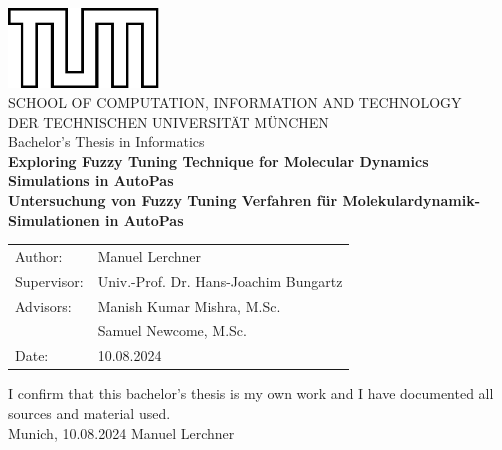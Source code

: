 \documentclass[11pt,
               a4paper,
               bibtotoc,
               idxtotoc,
               headsepline,
               footsepline,
               footexclude,
               BCOR12mm,
               DIV13,
               openany,   %
               ]
               {scrbook}
\def\doctype{Bachelor's Thesis\xspace}
\def\studyProgram{Informatics}
\def\title{Exploring Fuzzy Tuning Technique for Molecular Dynamics Simulations in AutoPas}
\def\titleGer{Untersuchung von Fuzzy Tuning Verfahren für Molekulardynamik-Simulationen in AutoPas}
\def\author{Manuel Lerchner}
\def\supervisor{Univ.-Prof. Dr. Hans-Joachim Bungartz}
\def\advisorFst{Manish Kumar Mishra, M.Sc.}
\def\advisorSnd{Samuel Newcome, M.Sc.}
\def\date{10.08.2024}
\begin{document}
\def\bcorcor{0.15cm}
\addtolength{\hoffset}{\bcorcor}
\thispagestyle{empty}
\vspace{10mm}
\begin{center}
    \includegraphics[width=4cm]{templateStuff/tumlogo.pdf}\\[5mm]
    \huge SCHOOL OF COMPUTATION, INFORMATION AND TECHNOLOGY\\[5mm]
    \large DER TECHNISCHEN UNIVERSITÄT MÜNCHEN\\[24mm]
    {\Large \doctype in \studyProgram}\\[20mm]
    {\LARGE\textbf{\title}}\\[10mm]
    {\LARGE\textbf{\titleGer}}\\[10mm]
    \begin{tabular}{ll}
        \Large Author:     & \Large \author     \\[2mm]
        \Large Supervisor: & \Large \supervisor \\[2mm]
        \Large Advisors:   & \Large \advisorFst \\[2mm]
        \Large             & \Large \advisorSnd \\[2mm]
        \Large Date:       & \Large \date
    \end{tabular}
\end{center}

\addtolength{\hoffset}{\bcorcor}
\newpage


\cleardoubleemptypage

\thispagestyle{empty}
\vspace*{0.7\textheight}
\noindent
I confirm that this \MakeLowercase{\doctype} is my own work and I have documented all sources and material used.\\

\vspace{15mm}
\noindent
Munich, \date \hspace{5cm} \author
\cleardoubleemptypage

\end{document}
